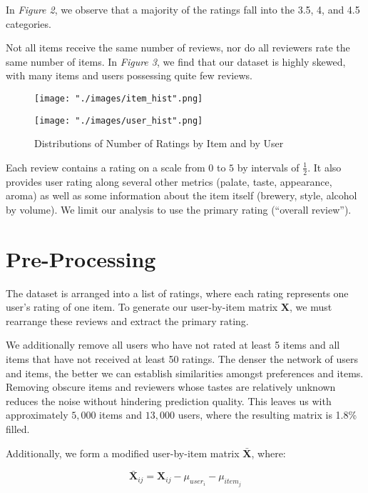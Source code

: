 \documentclass[12pt]{article}
\begin{document}
In \textit{Figure 2}, we observe that a majority of the ratings fall into the 3.5, 4, and 4.5 categories.

Not all items receive the same number of reviews, nor do all reviewers rate the same number of items. In \textit{Figure 3}, we find that our dataset is highly skewed, with many items and users possessing quite few reviews.

\begin{figure}[!ht]
\caption{Distributions of Number of Ratings by Item and by User}
\centering
\begin{minipage}{.5\textwidth}
  \centering
  \texttt{[image: "./images/item\_hist".png]}
\end{minipage}%
\begin{minipage}{.5\textwidth}
  \centering
  \texttt{[image: "./images/user\_hist".png]}
\end{minipage}
\end{figure}

Each review contains a rating on a scale from $0$ to $5$ by intervals of $\frac{1}{2}$. It also provides user rating along several other metrics (palate, taste, appearance, aroma) as well as some information about the item itself (brewery, style, alcohol by volume). We limit our analysis to use the primary rating (``overall review'').

\section{Pre-Processing}
The dataset is arranged into a list of ratings, where each rating represents one user's rating of one item. To generate our user-by-item matrix $\mathbf{X}$, we must rearrange these reviews and extract the primary rating.

We additionally remove all users who have not rated at least 5 items and all items that have not received at least 50 ratings. The denser the network of users and items, the better we can establish similarities amongst preferences and items. Removing obscure items and reviewers whose tastes are relatively unknown reduces the noise without hindering prediction quality. This leaves us with approximately $5,000$ items and $13,000$ users, where the resulting matrix is 1.8\% filled.

Additionally, we form a modified user-by-item matrix $\mathbf{\bar X}$, where:

$$ \mathbf{\bar X}_{ij} = \mathbf{X}_{ij} - \mu_{user_i} - \mu_{item_j}$$
\end{document}
